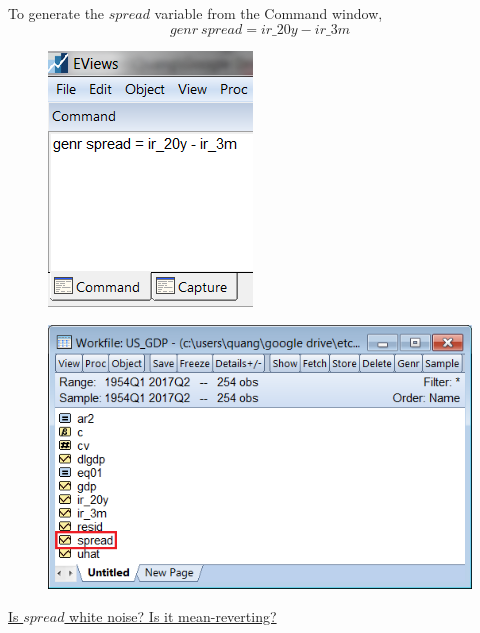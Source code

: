 \documentclass[12pt]{report}
\begin{document}
\noindent To generate the $spread$ variable from the Command window, $$genr\ spread=ir\_20y-ir\_3m$$
\begin{figure}[H]
	\centerline{\includegraphics{tute11_34}}
\end{figure}
\vspace{-\baselineskip}
\begin{figure}[H]
	\centerline{\includegraphics{tute11_35}}
\end{figure}
\vspace{-\baselineskip}

\noindent \uline{Is $spread$ white noise? Is it mean-reverting?}
\end{document}
